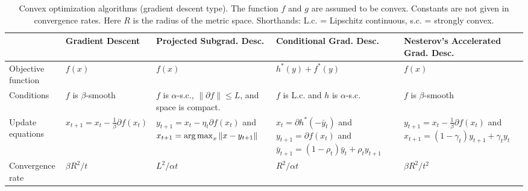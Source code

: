 \documentclass[reqno,oneside,a4paper]{amsart}
\begin{document}
\begin{landscape}


\begin{table}[htdp]
\begin{center}
\caption{Convex optimization algorithms (gradient descent type). The function $f$ and $g$ are assumed to be convex. Constants are not given in convergence rates. Here $R$ is the radius of the metric space. Shorthands: L.c. = Lipschitz continuous, s.c. = strongly convex. }
\begin{tabularx}{8in}{|l|L|L|L|L|}
\hline & Gradient Descent & Projected Subgrad. Desc. & Conditional Grad. Desc. & Nesterov's Accelerated Grad. Desc.   \\ 
\hline
Objective function  &
$f(x)$ &
$f(x)$ &
$h^{*}(y) + f^{*}(y)$ &
$f(x)$ \\
\hline
Conditions & 
$f$ is $\beta$-smooth &
$f$ is $\alpha$-s.c., $\|\partial f\| \le L$, and space is compact. & 
$f$ is L.c. and $h$ is $\alpha$-s.c. &
$f$ is $\beta$-smooth \\
\hline
Update equations &
$x_{t+1} = x_{t} - \frac{1}{\beta}\partial f(x_{t})$ &
$y_{t+1} = x_{t} - \eta_{t}\partial f(x_{t})$ and $x_{t+1} = \argmax_{x} \| x - y_{t+1} \|$ &
$x_{t} = \partial h^{*}(-\bar y_{t})$ and $y_{t+1} = \partial f(x_{t})$ and $\bar y_{t+1} = (1 - \rho_{t})\bar y_{t} + \rho_{t} y_{t+1}$&
$y_{t+1} = x_{t} - \frac{1}{\beta}\partial f(x_{t})$ and $x_{t+1} = (1- \gamma_{t})y_{t+1} + \gamma_{t}y_{t}$ \\
\hline
Convergence rate &
$\beta R^{2}/t$ &
$L^{2} / \alpha t$ &
$R^{2} / \alpha t$ &
$\beta R^{2}/t^{2}$ \\
\hline
\end{tabularx}
\label{table:gd-convex-opt-algs}
\end{center}
\end{table}


\end{landscape}
\end{document}
